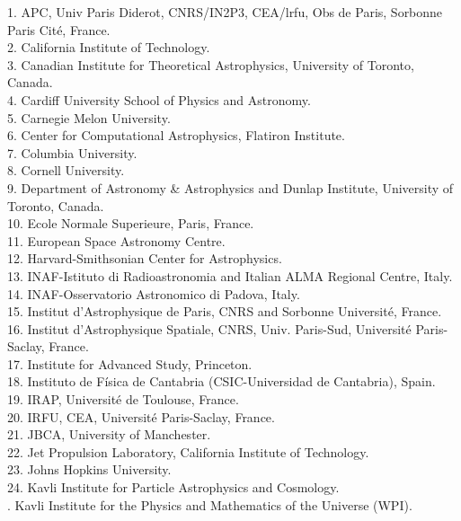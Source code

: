 \documentclass[PICOReport.tex]{subfiles}
\begin{document}
\begin{multicols}{2}
\raggedright
\scriptsize {
1. APC, Univ Paris Diderot, CNRS/IN2P3, CEA/lrfu, Obs de Paris, Sorbonne Paris Cit\'e, France.  \\
2. California Institute of Technology.  \\
3. Canadian Institute for Theoretical Astrophysics, University of Toronto, Canada.  \\
4. Cardiff University School of Physics and Astronomy.  \\
5. Carnegie Melon University.  \\
6. Center for Computational Astrophysics, Flatiron Institute.  \\
7. Columbia University.  \\
8. Cornell University.  \\
9. Department of Astronomy \& Astrophysics and Dunlap Institute, University of Toronto, Canada.  \\
10. Ecole Normale Superieure, Paris, France.  \\
11. European Space Astronomy Centre.  \\
12. Harvard-Smithsonian Center for Astrophysics.  \\
13. INAF-Istituto di Radioastronomia and Italian ALMA Regional Centre, Italy.  \\
14. INAF-Osservatorio Astronomico di Padova, Italy.  \\
15. Institut d'Astrophysique de Paris, CNRS and Sorbonne Universit\'e, France.  \\
16. Institut d'Astrophysique Spatiale, CNRS, Univ. Paris-Sud, Universit\'e Paris-Saclay, France.  \\
17. Institute for Advanced Study, Princeton.  \\
18. Instituto de F\'isica de Cantabria (CSIC-Universidad de Cantabria), Spain.  \\
19. IRAP, Universit\'e de Toulouse, France.  \\
20. IRFU, CEA, Universit\'e Paris-Saclay, France.  \\
21. JBCA, University of Manchester.  \\
22. Jet Propulsion Laboratory, California Institute of Technology.  \\
23. Johns Hopkins University.  \\
24. Kavli Institute for Particle Astrophysics and Cosmology.  \\
. Kavli Institute for the Physics and Mathematics of the Universe (WPI).  \\
}
\end{multicols}
\end{document}
